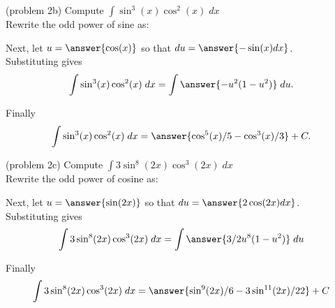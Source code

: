 \documentclass{ximera}
\begin{document}
\begin{problem}{\color{gray}(problem 2b)} 
Compute $\displaystyle{\int \sin^3(x)\cos^2(x) \; dx}$\\

Rewrite the odd power of sine as:

\begin{multipleChoice}
\end{multipleChoice}

Next, let $u = \answer{\cos(x)}$ so that $du = \answer{-\sin(x) dx}$.\\

Substituting gives
\[
\int \sin^3(x)\cos^2(x) \; dx= \int \answer{-u^2(1-u^2)} \; du.
\]

Finally
\[
\int \sin^3(x)\cos^2(x) \; dx= \answer{\cos^5(x)/5 - \cos^3(x)/3} + C.
\]

\end{problem}



\begin{problem}{\color{gray}(problem 2c)}
Compute $\displaystyle{\int 3\sin^8(2x)\cos^3(2x) \; dx}$\\

Rewrite the odd power of cosine as:

\begin{multipleChoice}
\end{multipleChoice}

Next, let $u = \answer{\sin(2x)}$ so that $du = \answer{2\cos(2x) dx}$.\\

Substituting gives
\[
\int 3\sin^8(2x)\cos^3(2x) \; dx= \int \answer{3/2 u^8(1-u^2)} \; du
\]

Finally
\[
\int 3\sin^8(2x)\cos^3(2x) \; dx= \answer{\sin^9(2x)/6 - 3 \sin^{11}(2x)/22} + C
\]
\end{problem}
\end{document}
